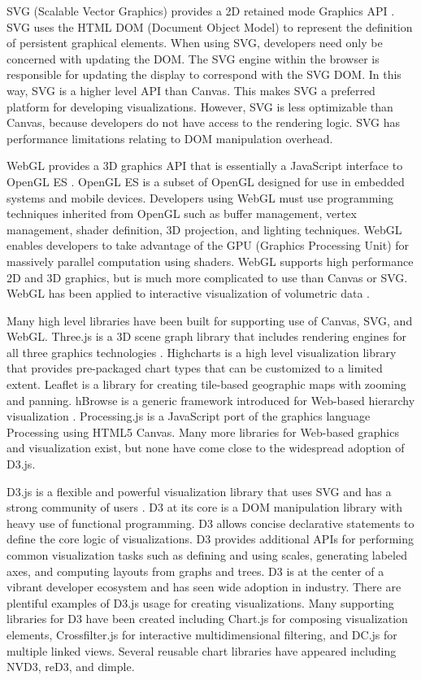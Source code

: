 SVG (Scalable Vector Graphics) provides a 2D retained mode Graphics API \cite{svg}. SVG uses the HTML DOM (Document Object Model) to represent the definition of persistent graphical elements. When using SVG, developers need only be concerned with updating the DOM. The SVG engine within the browser is responsible for updating the display to correspond with the SVG DOM. In this way, SVG is a higher level API than Canvas. This makes SVG a preferred platform for developing visualizations. However, SVG is less optimizable than Canvas, because developers do not have access to the rendering logic. SVG has performance limitations relating to DOM manipulation overhead.

WebGL provides a 3D graphics API that is essentially a JavaScript interface to OpenGL ES \cite{matsuda2013webgl}. OpenGL ES is a subset of OpenGL designed for use in embedded systems and mobile devices. Developers using WebGL must use programming techniques inherited from OpenGL such as buffer management, vertex management, shader definition, 3D projection, and lighting techniques. WebGL enables developers to take advantage of the GPU (Graphics Processing Unit) for massively parallel computation using shaders. WebGL supports high performance 2D and 3D graphics, but is much more complicated to use than Canvas or SVG. WebGL has been applied to interactive visualization of volumetric data \cite{congote2011interactive}.

Many high level libraries have been built for supporting use of Canvas, SVG, and WebGL. Three.js is a 3D scene graph library that includes rendering engines for all three graphics technologies \cite{cabello2010three}. Highcharts is a high level visualization library that provides pre-packaged chart types that can be customized to a limited extent. Leaflet is a library for creating tile-based geographic maps with zooming and panning. hBrowse is a generic framework introduced for Web-based hierarchy visualization \cite{kokoszkiewicz2012hbrowse}. Processing.js is a JavaScript port of the graphics language Processing using HTML5 Canvas. Many more libraries for Web-based graphics and visualization exist, but none have come close to the widespread adoption of D3.js.

D3.js is a flexible and powerful visualization library that uses SVG and has a strong community of users \cite{d3}. D3 at its core is a DOM manipulation library with heavy use of functional programming. D3 allows concise declarative statements to define the core logic of visualizations. D3 provides additional APIs for performing common visualization tasks such as defining and using scales, generating labeled axes, and computing layouts from graphs and trees. D3 is at the center of a vibrant developer ecosystem and has seen wide adoption in industry. There are plentiful examples of D3.js usage for creating visualizations. Many supporting libraries for D3 have been created including Chart.js for composing visualization elements, Crossfilter.js for interactive multidimensional filtering, and DC.js for multiple linked views. Several reusable chart libraries have appeared including NVD3, reD3, and dimple.

